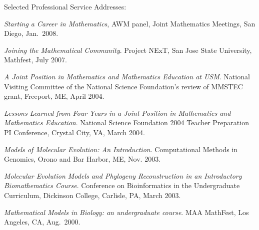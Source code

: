\documentclass[10pt]{report}
\begin{document}
{%

\smallskip

{\sc Selected Professional Service Addresses:}

\smallskip

{\it Starting a Career in Mathematics}, AWM panel, Joint Mathematics Meetings,
San Diego, Jan.~2008.

{\it Joining the Mathematical Community}.  Project NExT, San Jose State
University, Mathfest, July 2007.

{}

{\it A Joint Position in Mathematics and Mathematics Education at USM}.
National Visiting Committee of the National Science Foundation's review
of MMSTEC grant, Freeport, ME, April 2004.

{\it Lessons Learned from Four Years in a Joint Position in Mathematics
and Mathematics Education}. National Science Foundation 2004 Teacher
Preparation PI Conference, Crystal City, VA, March 2004.

{}



{\it Models of Molecular Evolution: An Introduction}. Computational
Methods in Genomics, Orono and Bar Harbor, ME, Nov. 2003.

{\it Molecular Evolution Models and Phylogeny Reconstruction in an
Introductory Biomathematics Course}. Conference on Bioinformatics in the
Undergraduate Curriculum, Dickinson College, Carlisle, PA, March 2003.

{\it Mathematical Models in Biology: an undergraduate course}. MAA
MathFest, Los Angeles, CA, Aug.~2000.

\begin{comment}
{\it To reform or not to reform: Where do we stand now?}. Invited
panelist, MAA MathFest, Los Angeles, CA, Aug.~2000.

{\it Epidemic Modeling: MATLAB Exercises for an Undergraduate Course in
Mathematical Models in Biology}. Invited speaker, MAA special session on
Discrete Mathematics Revisited, Joint Mathematics Meetings, San Antonio,
TX, Jan. 1999.

{\it An Introduction to Hyperbolic Geometry}.  Colloquium, Western
Carolina University, Sylva, NC, Nov. 1998.


\end{comment}}
\end{document}
